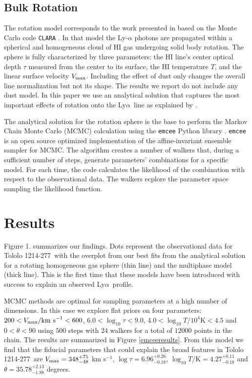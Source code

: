 \documentclass[a4,useAMS,usenatbib,usegraphicx]{mn2e}
\newcommand{\tol}{Tololo 1214-277}
\newcommand{\lya}{Ly$\alpha$}
\begin{document}
\subsection{Bulk Rotation}

The rotation model corresponds to the work presented in
\citep{GaravitoCamargo2014} based on the Monte Carlo code
\texttt{CLARA} \citep{CLARA}. 
In that model the Ly-$\alpha$ photons are propagated 
within a spherical and homogeneous cloud of HI gas undergoing solid
body rotation.
The sphere is fully characterized by three parameters: the HI line's
center optical  depth $\tau$ measured from the center to its surface, the HI
temperature $T$, and the linear surface velocity $V_{\rm max}$.  
Including the effect of dust only changes the overall line
normalization but not its shape.  
The results we report do not include any dust model.
In this paper we use an analytical solution that captures the most
important effects of rotation onto the \lya\ line as explained by \citet{GaravitoCamargo2014}.


The analytical solution for the rotation sphere is the base to
perform the Markov Chain Monte Carlo (MCMC) calculation using the
\texttt{emcee} Python library \citep{2013PASP..125..306F}. \texttt{emcee} 
is an open source optimized implementation of the affine-invariant 
ensemble sampler for MCMC. 
The algorithm creates a number of walkers that,
during a sufficient number of steps, generate parameters' combinations
for a specific model. For each time, the code calculates the likelihood of the
combination with respect to the observational data. The walkers ecplore
the parameter space sampling the likelihood function.


\section{Results}


Figure 1. summarizes our findings.
Dots represent the observational data for \tol\ with the
overplot from our best fits from the analytical solution for a
rotating homogeneous gas sphere (thin line) and the multiphase
model (thick line). 
This is the first time that these models have been introduced with
success to explain an observed \lya\ profile.   


MCMC methods are optimal for sampling parameters at a high number of 
dimensions. In this case we explore flat priors on four parameters:
$200<V_{\rm max}/\mathrm{km\ s}^{-1} <600$,  
$6.0<\log_{10}\tau<9.0$, $4.0<\log_{10} T/10^4\mathrm{K}< 4.5$ and
$0<\theta<90$ using $500$ steps with $24$ walkers for a total of
$12000$ points in the chain. 
The results are summarized in 
Figure \ref{emceeresults}. 
From this model we find that the fiducial 
parameters that could explain the broad features in \tol\ are 
$V_{\rm max}=348^{+75}_{-48}$ km s$^{-1}$, $\log \tau = 6.96^{+0.26}_{-0.18}$, 
$\log_{10} T/\mathrm {K} = 4.27^{+0.11}_{-0.18}$ and $\theta = 35.78^{+2.13}_{-1.88}$ 
degrees.
\end{document}
